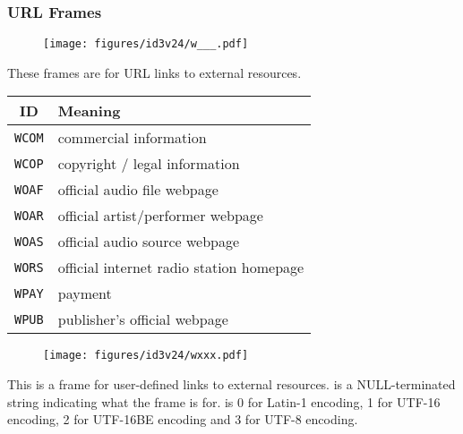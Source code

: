 \subsubsection{URL Frames}
\begin{figure}[h]
\texttt{[image: figures/id3v24/w\_\_\_.pdf]}
\end{figure}
These frames are for URL links to external resources.
\par
\begin{table}[h]
\begin{tabular}{|c|l|}
\hline
ID & Meaning \\
\hline
\texttt{WCOM} & commercial information \\
\texttt{WCOP} & copyright / legal information \\
\texttt{WOAF} & official audio file webpage \\
\texttt{WOAR} & official artist/performer webpage \\
\texttt{WOAS} & official audio source webpage \\
\texttt{WORS} & official internet radio station homepage \\
\texttt{WPAY} & payment \\
\texttt{WPUB} & publisher's official webpage \\
\hline
\end{tabular}
\end{table}

\begin{figure}[h]
\texttt{[image: figures/id3v24/wxxx.pdf]}
\end{figure}
This is a frame for user-defined links to external resources.
 is a NULL-terminated string indicating
what the frame is for.
 is 0 for Latin-1 encoding, 1 for UTF-16 encoding,
2 for UTF-16BE encoding and 3 for UTF-8 encoding.
